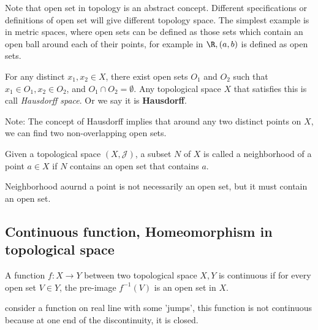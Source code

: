 \begin{refsection}
\begin{remark}
Note that open set in topology is an abstract concept. Different specifications or definitions of open set will give different topology space. \cite{wiki:openset}The simplest example is in metric spaces, where open sets can be defined as those sets which contain an open ball around each of their points, for example  in $ \R,(a,b)$ is defined as open sets.
\end{remark}


\begin{definition}
For any distinct $x_1,x_2\in X$, there exist open sets $O_1$ and $O_2$ such that $x_1 \in O_1, x_2\in O_2$, and $O_1\cap O_2 = \emptyset$. Any topological space $X$ that satisfies this is call \emph{Hausdorff space}. Or we say it is \textbf{Hausdorff}.
\end{definition}

\begin{remark}
Note: The concept of Hausdorff implies that around any two distinct points on $X$, we can find two non-overlapping open sets. \cite{krim2015geometric} 
\end{remark}

\begin{definition}[Neighborhood]
Given a topological space $(X,\mathcal{J})$, a subset $N$ of $X$ is called a neighborhood of a point $a\in X$ if $N$ contains an open set that contains $a$.
\end{definition}

\begin{remark}
	Neighborhood aournd a point is not necessarily an open set, but it must contain an open set.
\end{remark}



\subsection{Continuous function, Homeomorphism in topological space}
\begin{definition}
A function $f: X\rightarrow Y$ between two topological space $X,Y$ is continuous if for every open set $V \in Y$, the pre-image $f^{-1}(V)$ is an open set in $X$.
\end{definition}

\begin{remark}
consider a function on real line with some 'jumps', this function is not continuous because at one end of the discontinuity, it is closed. 
\end{remark}
 

\end{refsection}
